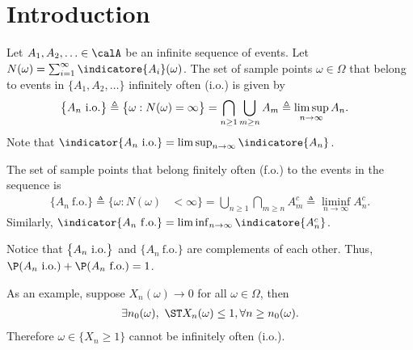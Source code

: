 \documentclass[../aipt.tex]{subfiles}
\begin{document}

\section{Introduction}
Let $A_1, A_2, \ldots \in \calA$ be an infinite sequence of events. Let $N(\omega) = \sum_{i=1}^{\infty} \indicatore{A_i}(\omega)$. The set of sample points $\omega\in\Omega$ that belong to events in $\{A_1,A_2,\ldots\}$ infinitely often (i.o.) is given by 
\begin{align*} 
\big\{A_n \ \mathrm{i.o.}\big\} \triangleq \big\{\omega: N(\omega) &= \infty\big\} = \bigcap_{n \geq 1} \bigcup_{m \geq n} A_m \triangleq \limsup_{n \to \infty} A_n.
\end{align*}
Note that $\indicator{A_n\io} = \limsup_{n\to\infty}\indicatore{A_n}$.

The set of sample points that belong finitely often (f.o.) to the events in the sequence is 
\begin{align*} 
\big\{A_n \ \text{f.o.}\big\} \triangleq \big\{\omega: N(\omega) &< \infty\big\} = \bigcup_{n \geq 1} \bigcap_{m \geq n} A_m^c \triangleq \liminf_{n \to \infty} A_n^c.
\end{align*}
Similarly, $\indicator{A_n\fo} = \liminf_{n\to\infty}\indicatore{A_n^c}$.

Notice that $\big\{A_n \ \mathrm{i.o.}\big\}$ and $\big\{A_n \ \text{f.o.}\big\}$ are complements of each other. Thus, $\P(A_n \io) + \P(A_n \ \text{f.o.}) = 1$.

As an example, suppose $X_n(\omega) \to 0$ for all $\omega\in\Omega$, then 
\begin{align*}
\exists n_0(\omega),\ \ST X_n(\omega) \leq 1, \forall n \geq n_0(\omega).
\end{align*}
Therefore $\omega\in\{X_n \geq 1\}$ cannot be infinitely often (i.o.).
\end{document}
